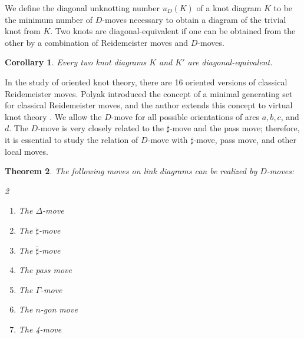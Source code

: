 \documentclass[12pt]{amsart}
\newtheorem{theorem}{Theorem}[section]
\newtheorem{corollary}[theorem]{Corollary}
\theoremstyle{remark}
\begin{document}
We define the diagonal unknotting number $u_D(K)$ of a knot diagram $K$ to be the minimum number of $D$-moves necessary to obtain a diagram of the trivial knot from $K$. Two knots are diagonal-equivalent if one can be obtained from the other by a combination of Reidemeister moves and $D$-moves.

\begin{corollary}
Every two knot diagrams $K$ and $K'$ are diagonal-equivalent. 
\end{corollary}

In the study of oriented knot theory, there are 16 oriented versions of classical Reidemeister moves. Polyak introduced the concept of a minimal generating set for classical Reidemeister moves, and the author extends this concept to virtual knot theory \cite{ali2025}. We allow the $D$-move for all possible orientations of arcs $a, b, c$, and $d$. The $D$-move is very closely related to the $\sharp$-move and the pass move; therefore, it is essential to study the relation of $D$-move with $\sharp$-move, pass move, and other local moves.

\begin{theorem}\label{tr}
 The following moves on link diagrams can be realized by $D$-moves:
 \begin{multicols}{2}
\begin{enumerate}
\item The $\Delta$-move \item The $\sharp$-move \item The $\overline{\sharp}$-move \item The pass move \item The $\Gamma$-move \item The $n$-gon move \item The 4-move
 \end{enumerate} 
 \end{multicols}
\end{theorem}
\end{document}
